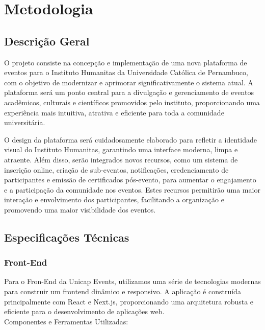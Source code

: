 \chapter{Metodologia}

\section{Descrição Geral}

O projeto consiste na concepção e implementação de uma nova plataforma de eventos para o Instituto Humanitas da Universidade Católica de Pernambuco, com o objetivo de modernizar e aprimorar significativamente o sistema atual. A plataforma será um ponto central para a divulgação e gerenciamento de eventos acadêmicos, culturais e científicos promovidos pelo instituto, proporcionando uma experiência mais intuitiva, atrativa e eficiente para toda a comunidade universitária.

O design da plataforma será cuidadosamente elaborado para refletir a identidade visual do Instituto Humanitas, garantindo uma interface moderna, limpa e atraente. Além disso, serão integrados novos recursos, como um sistema de inscrição online, criação de sub-eventos, notificações, credenciamento de participantes e emissão de certificados pós-evento, para aumentar o engajamento e a participação da comunidade nos eventos. Estes recursos permitirão uma maior interação e envolvimento dos participantes, facilitando a organização e promovendo uma maior visibilidade dos eventos.

\section{Especificações Técnicas}

\subsection{Front-End}

Para o Fron-End da Unicap Events, utilizamos uma série de tecnologias modernas para construir um frontend dinâmico e responsivo. A aplicação é construída principalmente com React e Next.js, proporcionando uma arquitetura robusta e eficiente para o desenvolvimento de aplicações web. \\

Componentes e Ferramentas Utilizadas: 

